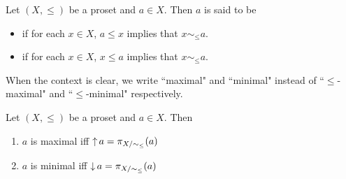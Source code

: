 \documentclass{book}
\begin{document}
	\begin{defn} 
		Let $(X, \leq)$ be a proset and $a \in X$. Then $a$ is said to be
		\begin{itemize}
			\item {} if for each $x \in X$, $a \leq x$ implies that $x \sim_{\leq} a$.  
			\item {} if for each $x \in X$, $x \leq a$ implies that $x \sim_{\leq} a$. 
		\end{itemize} 
	\end{defn}
	
	\begin{note}
		When the context is clear, we write ``maximal" and ``minimal" instead of ``$\leq$-maximal" and ``$\leq$-minimal" respectively. 
	\end{note}
	
	\begin{ex} 
		Let $(X, \leq)$ be a proset and $a \in X$. Then 
		\begin{enumerate}
			\item $a$ is maximal iff $\operatorname{\uparrow} a = \pi_{X/\sim_{\leq}}(a)$
			\item $a$ is minimal iff $\operatorname{\downarrow} a = \pi_{X/\sim_{\leq}}(a)$
		\end{enumerate}
	\end{ex}
	
\end{document}
